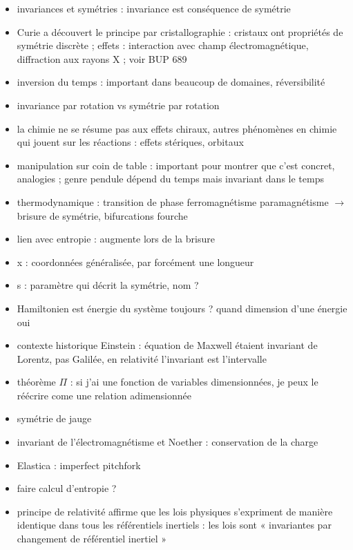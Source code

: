 \begin{remarques} \begin{itemize} 
\item invariances et symétries : invariance est conséquence de symétrie
\item Curie a découvert le principe par cristallographie : cristaux ont propriétés de symétrie discrète ; effets : interaction avec champ électromagnétique, diffraction aux rayons X ; voir BUP 689
\item inversion du temps : important dans beaucoup de domaines, réversibilité
\item invariance par rotation vs symétrie par rotation
\item la chimie ne se résume pas aux effets chiraux, autres phénomènes en chimie qui jouent sur les réactions : effets stériques, orbitaux
\item manipulation sur coin de table : important pour montrer que c'est concret, analogies ; genre pendule dépend du temps mais invariant dans le temps
\item thermodynamique : transition de phase ferromagnétisme paramagnétisme $\rightarrow$ brisure de symétrie, bifurcations fourche
\item lien avec entropie : augmente lors de la brisure
\item x : coordonnées généralisée, par forcément une longueur
\item s : paramètre qui décrit la symétrie, nom ?
\item Hamiltonien est énergie du système toujours ? quand dimension d'une énergie oui
\item contexte historique Einstein : équation de Maxwell étaient invariant de Lorentz, pas Galilée, en relativité l'invariant est l'intervalle 
\item théorème $\Pi$ : si j'ai une fonction de variables dimensionnées, je peux le réécrire come une relation adimensionnée
\item symétrie de jauge
\item invariant de l'électromagnétisme et Noether : conservation de la charge
\item Elastica : imperfect pitchfork
\item faire calcul d'entropie ?
\item principe de relativité affirme que les lois physiques s'expriment de manière identique dans tous les référentiels inertiels : les lois sont « invariantes par changement de référentiel inertiel »
\end{itemize} \end{remarques}

